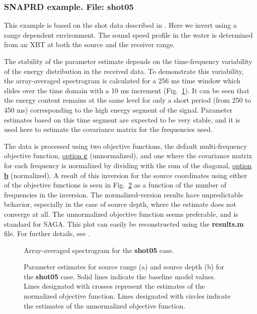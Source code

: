 \documentclass{saclantc}
\begin{document}
\subsubsection{SNAPRD  example. File: {\bf shot05}}
\label{se:shot05}
This example is based on the shot data described in 
\cite{haralabus:96,haralabus:ecua3}. Here we
invert using a  range dependent environment. The sound speed profile in the water
is determined from an XBT at both the source and the receiver range.

The stability of the parameter
estimate depends on the time-frequency variability of the energy distribution
in the received data. 
To demonstrate this variability, the array-averaged spectrogram 
is calculated for a 256 ms time window which slides
over the time domain with a 10 ms increment (Fig.~\ref{fig:fig}).   
It can be seen that the energy content remains at the same
level for only a short period (from 250 to 450 ms) 
corresponding to the high energy segment of the signal. 
Parameter estimates based on this time
segment are expected to be very stable, and it is used here to estimate
the covariance matrix for the frequencies used.

The data is processed using two objective functions,  the default 
multi-frequency objective function, 
\underline{option {\bf c}} (unnormalized), and one where the covariance
matrix for each frequency is normalized by dividing with the sum of
the diagonal, \underline{option {\bf b}} (normalized).
A result of this inversion for the source coordinates 
using either of the objective functions 
is seen in Fig.~\ref{fig:fig9} as a function of the number of
frequencies in the inversion. The
normalized-version results have unpredictable behavior, especially
in the case of source depth, where the estimate does not converge at
all.
 The unnormalized objective function seems preferable, and is standard
for {\sf SAGA}. This plot can easily be reconstructed using the {\bf
results.m} file. For further details, see 
\cite{haralabus:96,haralabus:ecua3}.

\begin{figure}
\epsfxsize=14cm
\centerline{}
\caption{\label{fig:fig} Array-averaged spectrogram for the {\bf
shot05} case. }
\end{figure}

\begin{figure}
\epsfxsize=12cm
\centerline{}
\caption{\label{fig:fig9} Parameter estimates for source range (a) and
source depth (b) for the {\bf shot05} case. Solid lines indicate the baseline
model values. Lines designated with crosses represent the estimates
of the normalized objective function.
Lines designated with circles indicate the estimates of the unnormalized
objective function.}
\end{figure} 
\end{document}
